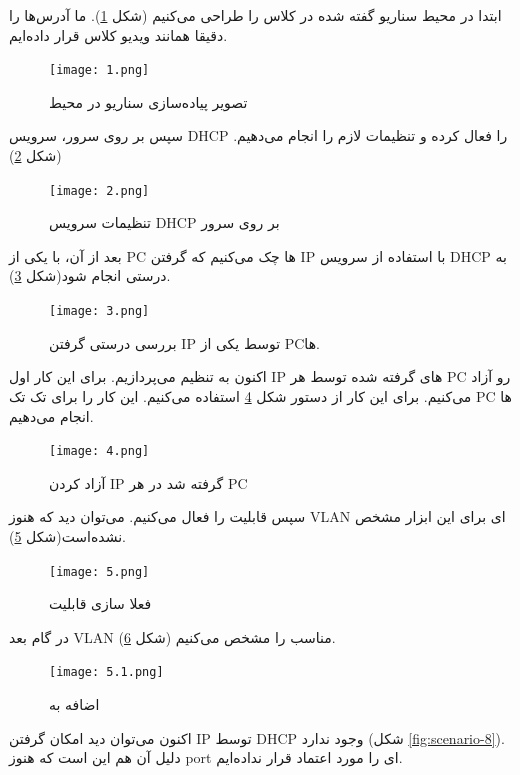 \documentclass{article}
\begin{document}
ابتدا در محیط  سناریو گفته شده در کلاس را طراحی می‌کنیم (شکل \ref{fig:scenario-1}).
ما آدرس‌ها را دقیقا همانند ویدیو کلاس قرار داده‌ایم.
\begin{figure}[h!]
	\centering
	\texttt{[image: 1.png]}
	\caption{تصویر پیاده‌سازی سناریو در محیط }
	\label{fig:scenario-1}
\end{figure}

سپس بر روی سرور، سرویس DHCP را فعال کرده و تنظیمات لازم را انجام می‌دهیم.
(شکل \ref{fig:scenario-2})

\begin{figure}[h!]
	\centering
	\texttt{[image: 2.png]}
	\caption{تنظیمات سرویس DHCP بر روی سرور}
	\label{fig:scenario-2}
\end{figure}

بعد از آن، با یکی از PC ها چک می‌کنیم که گرفتن IP با استفاده از سرویس DHCP به درستی انجام شود(شکل \ref{fig:scenario-3}).

\begin{figure}[h!]
	\centering
	\texttt{[image: 3.png]}
	\caption{بررسی درستی گرفتن IP توسط یکی از PCها.}
	\label{fig:scenario-3}
\end{figure}

اکنون به تنظیم  می‌پردازیم. برای این کار اول IP های گرفته شده توسط هر PC رو آزاد می‌کنیم. برای این کار از دستور شکل \ref{fig:scenario-4} استفاده می‌کنیم. این کار را برای تک تک PC ها انجام می‌دهیم.

\begin{figure}[h!]
	\centering
	\texttt{[image: 4.png]}
	\caption{آزاد کردن IP گرفته شد در هر PC}
	\label{fig:scenario-4}
\end{figure}

سپس قابلیت  را فعال می‌کنیم. می‌توان دید که هنوز VLAN ای برای این ابزار مشخص نشده‌است(شکل \ref{fig:scenario-5}).

\begin{figure}[h!]
	\centering
	\texttt{[image: 5.png]}
	\caption{فعلا سازی قابلیت }
	\label{fig:scenario-5}
\end{figure}

در گام بعد VLAN مناسب را مشخص می‌کنیم (شکل \ref{fig:scenario-6}).


\begin{figure}[h!]
	\centering
	\texttt{[image: 5.1.png]}
	\caption{اضافه  به }
	\label{fig:scenario-6}
\end{figure}

اکنون می‌توان دید امکان گرفتن IP توسط DHCP وجود ندارد (شکل \ref{fig:scenario-8}). دلیل آن هم این است که هنوز port ای را مورد اعتماد قرار نداده‌ایم.
\end{document}
